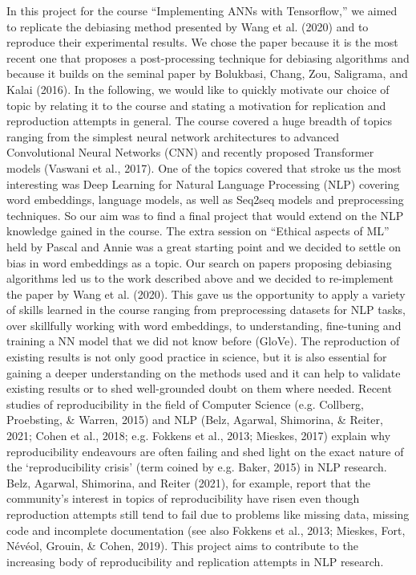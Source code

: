 \documentclass[
  english,
  man,floatsintext]{apa6}
\begin{document}
In this project for the course ``Implementing ANNs with Tensorflow,'' we aimed to replicate the debiasing method presented by Wang et al. (2020) and to reproduce their experimental results. We chose the paper because it is the most recent one that proposes a post-processing technique for debiasing algorithms and because it builds on the seminal paper by Bolukbasi, Chang, Zou, Saligrama, and Kalai (2016).
In the following, we would like to quickly motivate our choice of topic by relating it to the course and stating a motivation for replication and reproduction attempts in general.
The course covered a huge breadth of topics ranging from the simplest neural network architectures to advanced Convolutional Neural Networks (CNN) and recently proposed Transformer models (Vaswani et al., 2017). One of the topics covered that stroke us the most interesting was Deep Learning for Natural Language Processing (NLP) covering word embeddings, language models, as well as Seq2seq models and preprocessing techniques. So our aim was to find a final project that would extend on the NLP knowledge gained in the course. The extra session on ``Ethical aspects of ML'' held by Pascal and Annie was a great starting point and we decided to settle on bias in word embeddings as a topic. Our search on papers proposing debiasing algorithms led us to the work described above and we decided to re-implement the paper by Wang et al. (2020). This gave us the opportunity to apply a variety of skills learned in the course ranging from preprocessing datasets for NLP tasks, over skillfully working with word embeddings, to understanding, fine-tuning and training a NN model that we did not know before (GloVe).
The reproduction of existing results is not only good practice in science, but it is also essential for gaining a deeper understanding on the methods used and it can help to validate existing results or to shed well-grounded doubt on them where needed. Recent studies of reproducibility in the field of Computer Science (e.g. Collberg, Proebsting, \& Warren, 2015) and NLP (Belz, Agarwal, Shimorina, \& Reiter, 2021; Cohen et al., 2018; e.g. Fokkens et al., 2013; Mieskes, 2017) explain why reproducibility endeavours are often failing and shed light on the exact nature of the `reproducibility crisis' (term coined by e.g. Baker, 2015) in NLP research. Belz, Agarwal, Shimorina, and Reiter (2021), for example, report that the community's interest in topics of reproducibility have risen even though reproduction attempts still tend to fail due to problems like missing data, missing code and incomplete documentation (see also Fokkens et al., 2013; Mieskes, Fort, Névéol, Grouin, \& Cohen, 2019).
This project aims to contribute to the increasing body of reproducibility and replication attempts in NLP research.
\end{document}
